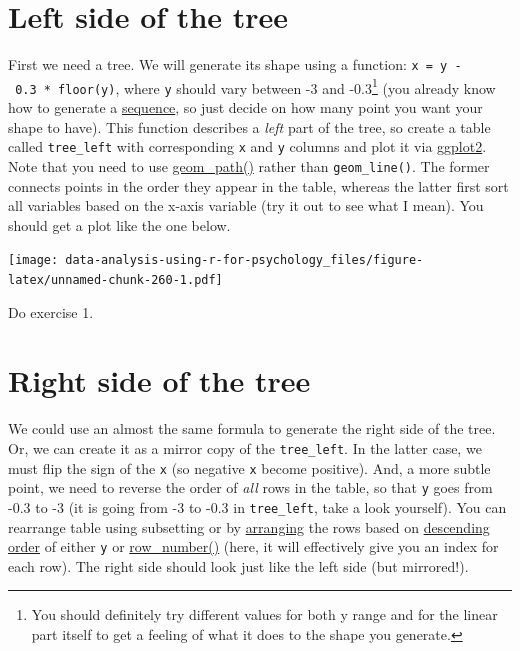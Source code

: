 \documentclass[
]{book}
\begin{document}
\hypertarget{left-side-of-the-tree}{%
\section{Left side of the tree}\label{left-side-of-the-tree}}

First we need a tree. We will generate its shape using a function: \texttt{x\ =\ y\ -\ 0.3\ *\ floor(y)}, where \texttt{y} should vary between -3 and -0.3\footnote{You should definitely try different values for both y range and for the linear part itself to get a feeling of what it does to the shape you generate.} (you already know how to generate a \href{https://stat.ethz.ch/R-manual/R-devel/library/base/html/seq.html}{sequence}, so just decide on how many point you want your shape to have). This function describes a \emph{left} part of the tree, so create a table called \texttt{tree\_left} with corresponding \texttt{x} and \texttt{y} columns and plot it via \href{https://ggplot2.tidyverse.org/}{ggplot2}. Note that you need to use \href{https://ggplot2.tidyverse.org/reference/geom_path.html}{geom\_path()} rather than \texttt{geom\_line()}. The former connects points in the order they appear in the table, whereas the latter first sort all variables based on the x-axis variable (try it out to see what I mean). You should get a plot like the one below.

\texttt{[image: data-analysis-using-r-for-psychology\_files/figure-latex/unnamed-chunk-260-1.pdf]}

Do exercise 1.

\hypertarget{right-side-of-the-tree}{%
\section{Right side of the tree}\label{right-side-of-the-tree}}

We could use an almost the same formula to generate the right side of the tree. Or, we can create it as a mirror copy of the \texttt{tree\_left}. In the latter case, we must flip the sign of the \texttt{x} (so negative \texttt{x} become positive). And, a more subtle point, we need to reverse the order of \emph{all} rows in the table, so that \texttt{y} goes from -0.3 to -3 (it is going from -3 to -0.3 in \texttt{tree\_left}, take a look yourself). You can rearrange table using subsetting or by \href{https://dplyr.tidyverse.org/reference/arrange.html}{arranging} the rows based on \href{https://dplyr.tidyverse.org/reference/desc.html?q=desc}{descending order} of either \texttt{y} or \href{https://dplyr.tidyverse.org/reference/ranking.html}{row\_number()} (here, it will effectively give you an index for each row). The right side should look just like the left side (but mirrored!).
\end{document}
